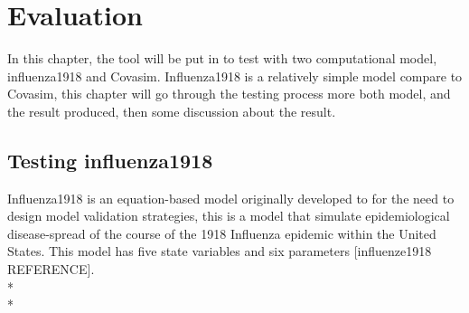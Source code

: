 \chapter{Evaluation}
In this chapter, the tool will be put in to test with two computational model, influenza1918 and Covasim. Influenza1918 is a relatively simple model compare to Covasim, this chapter will go through the testing process more both model, and the result produced, then some discussion about the result.
\section{Testing influenza1918}
Influenza1918 is an equation-based model originally developed to for the need to design model validation strategies, this is a model that simulate epidemiological disease-spread of the course of the 1918 Influenza epidemic within the United States.
This model has five state variables and six parameters [influenze1918 REFERENCE].\\*\\*

